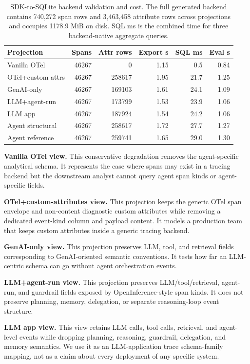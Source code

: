 \documentclass[conference]{IEEEtran}
\begin{document}
\begin{table}[t]
\centering
\scriptsize
\caption{SDK-to-SQLite backend validation and cost. The full generated
backend contains 740,272 span rows and 3,463,458 attribute rows across
projections and occupies 1178.9 MiB on disk. SQL ms is the combined time
for three backend-native aggregate queries.}
\label{tab:backend}
\begin{tabular}{@{}lrrrrr@{}}
\toprule
Projection & Spans & Attr rows & Export s & SQL ms & Eval s \\
\midrule
Vanilla OTel & 46267 & 0 & 1.15 & 0.5 & 0.84 \\
OTel+custom attrs & 46267 & 258617 & 1.95 & 21.7 & 1.25 \\
GenAI-only & 46267 & 169103 & 1.61 & 24.1 & 1.09 \\
LLM+agent-run & 46267 & 173799 & 1.53 & 23.9 & 1.06 \\
LLM app & 46267 & 187924 & 1.54 & 24.2 & 1.06 \\
Agent structural & 46267 & 258617 & 1.72 & 27.7 & 1.27 \\
Agent reference & 46267 & 259741 & 1.65 & 29.0 & 1.30 \\
\bottomrule
\end{tabular}
\end{table}

\textbf{Vanilla OTel view.} This conservative degradation removes the
agent-specific analytical schema. It represents the case where spans may
exist in a tracing backend but the downstream analyst cannot query agent
span kinds or agent-specific fields.

\textbf{OTel+custom-attributes view.} This projection keeps the generic
OTel span envelope and non-content diagnostic custom attributes while
removing a dedicated event-kind column and payload content. It models a
production team that keeps custom attributes inside a generic tracing
backend.

\textbf{GenAI-only view.} This projection preserves LLM, tool, and
retrieval fields corresponding to GenAI-oriented semantic conventions.
It tests how far an LLM-centric schema can go without agent
orchestration events.

\textbf{LLM+agent-run view.} This projection preserves
LLM/tool/retrieval, agent-run, and guardrail fields exposed by
OpenInference-style span kinds. It does not preserve planning, memory,
delegation, or separate reasoning-loop event structure.

\textbf{LLM app view.} This view retains LLM calls, tool calls,
retrieval, and agent-level events while dropping planning, reasoning,
guardrail, delegation, and memory semantics. We use it as an
LLM-application trace schema-family mapping, not as a claim about every
deployment of any specific system.
\end{document}
